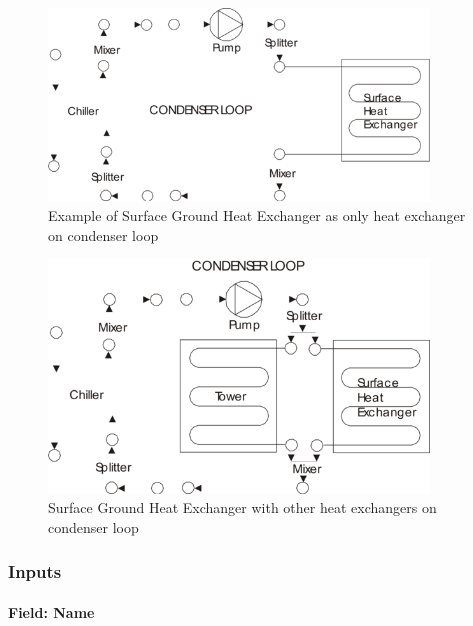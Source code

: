 \begin{figure}[hbtp] %
\centering
\includegraphics[width=0.9\textwidth, height=0.9\textheight, keepaspectratio=true]{media/image205.png}
\caption{Example of Surface Ground Heat Exchanger as only heat exchanger on condenser loop \protect \label{fig:example-of-surface-ground-heat-exchanger}}
\end{figure}

\begin{figure}[hbtp] %
\centering
\includegraphics[width=0.9\textwidth, height=0.9\textheight, keepaspectratio=true]{media/image206.png}
\caption{Surface Ground Heat Exchanger with other heat exchangers on condenser loop \protect \label{fig:surface-ground-heat-exchanger-with-other-heat}}
\end{figure}

\subsubsection{Inputs}\label{inputs-13-002}

\paragraph{Field: Name}\label{field-name-12-001}


